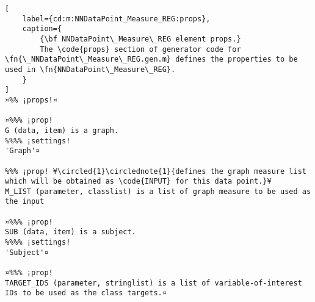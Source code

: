 \documentclass{tufte-handout}
\begin{document}
\begin{lstlisting}[
	label={cd:m:NNDataPoint_Measure_REG:props},
	caption={
		{\bf NNDataPoint\_Measure\_REG element props.}
		The \code{props} section of generator code for \fn{\_NNDataPoint\_Measure\_REG.gen.m} defines the properties to be used in \fn{NNDataPoint\_Measure\_REG}.
	}
]
¤%% ¡props!¤

¤%%% ¡prop!  
G (data, item) is a graph.
%%%% ¡settings!
'Graph'¤

%%% ¡prop! ¥\circled{1}\circlednote{1}{defines the graph measure list which will be obtained as \code{INPUT} for this data point.}¥
M_LIST (parameter, classlist) is a list of graph measure to be used as the input

¤%%% ¡prop!
SUB (data, item) is a subject.
%%%% ¡settings!
'Subject'¤

¤%%% ¡prop!
TARGET_IDS (parameter, stringlist) is a list of variable-of-interest IDs to be used as the class targets.¤

\end{lstlisting}

\clearpage
\end{document}
